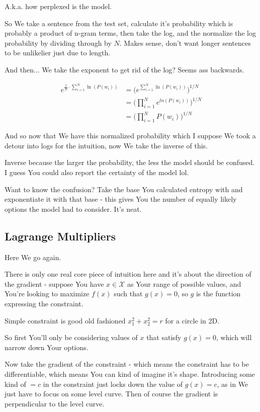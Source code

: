 \documentclass{article}
\begin{document}
			A.k.a. how perplexed is the model.
			
			So We take a sentence from the test set, calculate it's probability which is probably a product of n-gram terms, then take the log, and the normalize the log probability by dividing through by $N$. Makes sense, don't want longer sentences to be unlikelier just due to length.
			
			And then... We take the exponent to get rid of the log? Seems ass backwards.
			
			\begin{align}
				e^{\frac{1}{N}\cdot\sum^N_{i=1}\ln(P(w_i))} &= \big(e^{\sum^N_{i=1}\ln(P(w_i))}\big)^{1/N}\\
				&= \bigg(\prod^N_{i=1} e^{ln(P(w_i))}\bigg)^{1/N}\\
				&= \bigg(\prod^N_{i=1} P(w_i)\bigg)^{1/N}
			\end{align}
			
			And so now that We have this normalized probability which I suppose We took a detour into logs for the intuition, now We take the inverse of this.
			
			Inverse because the larger the probability, the less the model should be confused. I guess You could also report the certainty of the model lol.
			
			Want to know the confusion? Take the base You calculated entropy with and exponentiate it with that base - this gives You the number of equally likely options the model had to consider. It's neat.
			
			
	\subsection{Lagrange Multipliers}
	
		Here We go again.
		
		There is only one real core piece of intuition here and it's about the direction of the gradient - suppose You have $x\in\mathcal{X}$ as Your range of possible values, and You're looking to maximize $f(x)$ such that $g(x) = 0$, so $g$ is the function expressing the constraint.
		
		Simple constraint is good old fashioned $x_1^2+x_2^2=r$ for a circle in 2D.
		
		So first You'll only be considering values of $x$ that satisfy $g(x)=0$, which will narrow down Your options.
		
		Now take the gradient of the constraint - which means the constraint has to be differentiable, which means You can kind of imagine it's shape. Introducing some kind of $=c$ in the constraint just locks down the value of $g(x)=c$, as in We just have to focus on some level curve. Then of course the gradient is perpendicular to the level curve.
		
\end{document}
